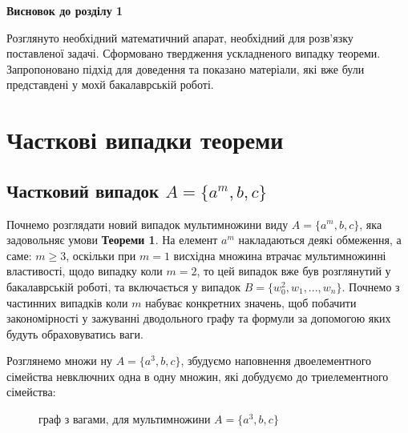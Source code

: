 \textbf{Висновок до розділу 1}

	Розглянуто необхідний математичний апарат, необхідний для розв'язку поставленої задачі. Сформовано твердження ускладненого випадку теореми. Запропоновано підхід для доведення та показано матеріали, які вже були представдені у мохй бакалаврській роботі.
	
	
\newpage

\chapter{Часткові випадки теореми}
\section{Частковий випадок $A = \{a^m, b, c\}$}

Почнемо розглядати новий випадок мультимножини виду $A = \{a^m, b, c\}$, яка задовольняє умови {\bf Теореми 1}. На елемент $a^m$ накладаються деякі обмеження, а саме: $m \geq 3 $, оскільки при $ m = 1 $ висхідна множина втрачає мультимножинні властивості, щодо випадку коли  $ m = 2 $, то цей випадок вже був розглянутий у бакалаврській роботі, та включається у випадок $B = \{w_0^{2}, w_1,...,w_n\}$. Почнемо з частинних випадків коли  $ m $ набуває конкретних значень, щоб побачити закономірності у зажуванні дводольного графу та формули за допомогою яких будуть обраховуватись ваги.

\begin{example}

Розглянемо множи ну $ A = \{a^3, b, c\} $, збудуємо наповнення двоелементного сімейства невключних одна в одну множин, які добудуємо до триелементного сімейства:
\begin{figure}
\begin{center}
\end{center}
\caption{граф з вагами, для мультимножини $ A = \{a^3, b, c\}$}
\end{figure}

\end{example}

